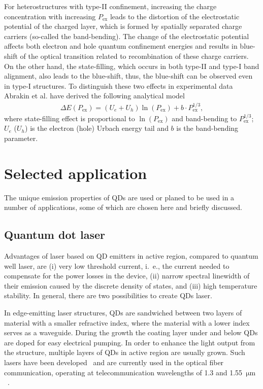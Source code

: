 \documentclass[
a4paper, %
11pt, %
onecolumn, %
openany, %
oldfontcommands,
]{memoir}
\begin{document}
For heterostructures with type-II confinement, increasing the charge concentration with increasing $P_\mathrm{ex}$ leads to the distortion of the electrostatic potential of the charged layer, which is formed by spatially separated charge carriers (so-called the band-bending). The change of the electrostatic potential affects both electron and hole quantum confinement energies and results in blue-shift of the optical transition related to recombination of these charge carriers. On the other hand, the state-filling, which occurs in both type-II and type-I band alignment, also leads to the blue-shift, thus, the blue-shift can be observed even in type-I structures. To distinguish these two effects in experimental data Abrakin et al. have derived the following analytical model~\cite{Abramkin_blueshift_analytical}
\begin{eqnarray}
\Delta E\left(P_\mathrm{ex}\right)=\left(U_e+U_h\right)\ln\left(P_\mathrm{ex}\right) + b\cdot P_\mathrm{ex}^{1/3},
\end{eqnarray}
where state-filling effect is proportional to $\ln\left( P_\mathrm{ex} \right)$ and band-bending to $P_\mathrm{ex}^{1/3}$; $U_e$ ($U_h$) is the electron (hole) Urbach energy tail and $b$ is the band-bending parameter.




\section{Selected application}
The unique emission properties of QDs are used or planed to be used in a number of applications, some of which are chosen here and briefly discussed.
\subsection*{Quantum dot laser}
Advantages of laser based on QD emitters in active region, compared to quantum well laser, are (i) very low threshold current, i.~e., the current needed to compensate for the power losses in the device, (ii) narrow spectral linewidth of their emission caused by the discrete density of states, and (iii) high temperature stability. In general, there are two possibilities to create QDs laser.

In edge-emitting laser structures, QDs are sandwiched between two layers of material with a smaller refractive index, where the material with a lower index serves as a waveguide. During the growth the coating layer under and below QDs are doped for easy electrical pumping. In order to enhance the light output from the structure, multiple layers of QDs in active region are usually grown. Such lasers have been developed~\cite{Kirstaedter,SellinAPL,SellinEL,Kovsh,Ledentsov} and are currently used in the optical fiber communication, operating at telecommunication wavelengths of 1.3 and 1.55~$\mathrm{\mu m}$~\cite{QDlaser}. 
\end{document}
